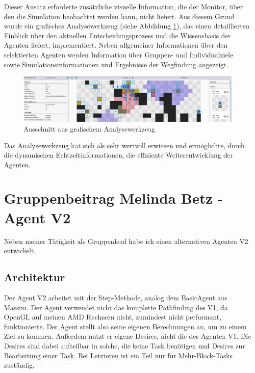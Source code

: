 \documentclass[runningheads]{llncs}
\begin{document}
Dieser Ansatz erforderte zusätzliche visuelle Information, die der Monitor, über den die Simulation beobachtet werden kann, nicht liefert. Aus diesem Grund wurde ein grafisches Analysewerkzeug (siehe Abbildung \ref{debugger}), das einen detaillierten Einblick über den aktuellen Entscheidungsprozess und die Wissensbasis der Agenten liefert, implementiert. Neben allgemeiner Informationen über den selektierten Agenten werden Information über Gruppen- und Individualziele sowie Simulationsinformationen und Ergebnisse der Wegfindung angezeigt.


\begin{figure}
\vspace{-3mm}
\includegraphics[scale=0.091]{./Referenzen/Debugger3.png}
\caption{Ausschnitt aus grafischem Analysewerkzeug}
\label{debugger}
\vspace{-3mm}
\end{figure}

Das Analysewerkzeug hat sich als sehr wertvoll erwiesen und ermöglichte, durch die dynamischen Echtzeitinformationen, die effiziente Weiterentwicklung der Agenten.


\section{Gruppenbeitrag Melinda Betz - Agent V2}\label{agentV2}
Neben meiner Tätigkeit als Gruppenlead habe ich einen alternativen Agenten V2 entwickelt.

\subsection{ Architektur}
Der Agent V2 arbeitet mit der Step-Methode, analog dem BasicAgent aus Massim. 
Der Agent verwendet nicht das komplette Pathfinding des V1, da OpenGL auf meinen AMD Rechnern nicht, zumindest nicht performant, funktionierte. Der Agent stellt also seine eigenen Berechnungen an, um zu einem Ziel zu kommen. Außerdem nutzt er eigene Desires, nicht die des Agenten V1. Die Desires sind dabei aufteilbar in solche, die keine Task benötigen und Desires zur Bearbeitung einer Task. Bei Letzteren ist ein Teil nur für Mehr-Block-Tasks zuständig.
\end{document}
